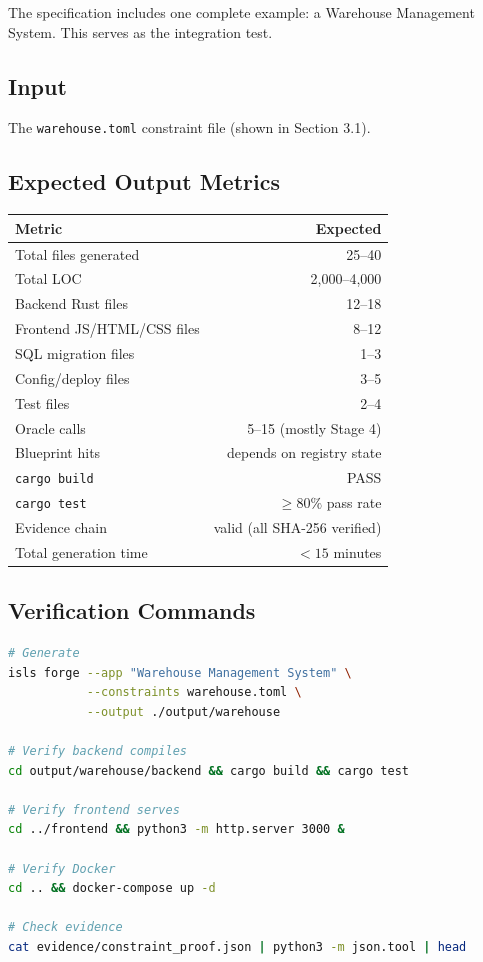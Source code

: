 \documentclass[11pt,a4paper]{article}
\begin{document}
The specification includes one complete example: a Warehouse
Management System. This serves as the integration test.

\subsection{Input}

The \texttt{warehouse.toml} constraint file (shown in Section 3.1).

\subsection{Expected Output Metrics}

\begin{center}
\begin{tabular}{lr}
\toprule
\textbf{Metric} & \textbf{Expected} \\
\midrule
Total files generated & 25--40 \\
Total LOC & 2,000--4,000 \\
Backend Rust files & 12--18 \\
Frontend JS/HTML/CSS files & 8--12 \\
SQL migration files & 1--3 \\
Config/deploy files & 3--5 \\
Test files & 2--4 \\
Oracle calls & 5--15 (mostly Stage 4) \\
Blueprint hits & depends on registry state \\
\texttt{cargo build} & PASS \\
\texttt{cargo test} & $\geq 80\%$ pass rate \\
Evidence chain & valid (all SHA-256 verified) \\
Total generation time & $< 15$ minutes \\
\bottomrule
\end{tabular}
\end{center}

\subsection{Verification Commands}

\begin{lstlisting}[language=bash]
# Generate
isls forge --app "Warehouse Management System" \
           --constraints warehouse.toml \
           --output ./output/warehouse

# Verify backend compiles
cd output/warehouse/backend && cargo build && cargo test

# Verify frontend serves
cd ../frontend && python3 -m http.server 3000 &

# Verify Docker
cd .. && docker-compose up -d

# Check evidence
cat evidence/constraint_proof.json | python3 -m json.tool | head
\end{lstlisting}
\end{document}

